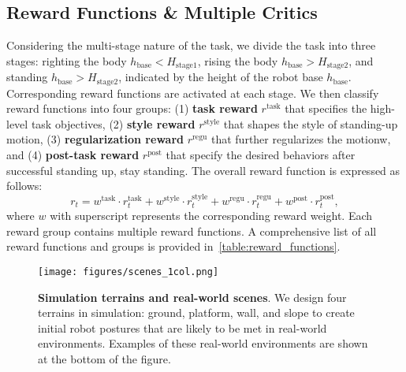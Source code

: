 \subsection{Reward Functions \& Multiple Critics}\label{subsec:multi_critic}
Considering the multi-stage nature of the task, we divide the task into three stages: righting the body $h_\mathrm{base}<H_{\mathrm{stage1}}$, rising the body $h_\mathrm{base}>H_{\mathrm{stage2}}$, and standing $h_\mathrm{base}>H_{\mathrm{stage2}}$, indicated by the height of the robot base $h_\mathrm{base}$. Corresponding reward functions are activated at each stage. We then classify reward functions into four groups: (1) \textbf{task reward} $r^{\mathrm{task}}$ that specifies the high-level task objectives, (2) \textbf{style reward} $r^{\mathrm{style}}$ that shapes the style of standing-up motion, (3)  \textbf{regularization reward} $r^{\mathrm{regu}}$ that further regularizes the motionw, and (4) \textbf{post-task reward} $r^{\mathrm{post}}$ that specify the desired behaviors after successful standing up, \ie stay standing. The overall reward function is expressed as follows:
\begin{equation*}
    r_t = w^{\mathrm{task}}\cdot r^{\mathrm{task}}_t + w^{\mathrm{style}}\cdot r^{\mathrm{style}}_t +  w^{\mathrm{regu}}\cdot r^{\mathrm{regu}}_t + w^{\mathrm{post}}\cdot r^{\mathrm{post}}_t,
\end{equation*}
where $w$ with superscript represents the corresponding reward weight. Each reward group contains multiple reward functions. A comprehensive list of all reward functions and groups is provided in~\cref{table:reward_functions}.

\begin{figure}[t]
    \centering
    \texttt{[image: figures/scenes\_1col.png]}
    \caption{\textbf{Simulation terrains and real-world scenes}. We design four terrains in simulation: ground, platform, wall, and slope to create initial robot postures that are likely to be met in real-world environments. Examples of these real-world environments are shown at the bottom of the figure.}
    \label{fig:terrain_examples}
\end{figure}

